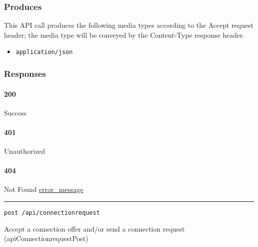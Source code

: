 \hypertarget{produces-111}{%
\subsubsection{Produces}\label{produces-111}}

This API call produces the following media types according to the
{Accept} request header; the media type will be conveyed by the
{Content-Type} response header.

\begin{itemize}
\tightlist
\item
  \texttt{application/json}
\end{itemize}

\hypertarget{responses-114}{%
\subsubsection{Responses}\label{responses-114}}

\hypertarget{section-372}{%
\paragraph{200}\label{section-372}}

Success

\hypertarget{section-373}{%
\paragraph{401}\label{section-373}}

Unauthorized \protect\hyperlink{}{}

\hypertarget{section-374}{%
\paragraph{404}\label{section-374}}

Not Found \protect\hyperlink{error_message}{error\_message}

\begin{center}\rule{0.5\linewidth}{\linethickness}\end{center}

\protect\hypertarget{apiConnectionrequestPost}{}{}

\begin{verbatim}
post /api/connectionrequest
\end{verbatim}

Accept a connection offer and/or send a connection request
({apiConnectionrequestPost})

